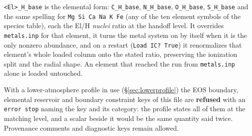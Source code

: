 \documentclass[english,a4paper]{my_memo}
\begin{document}
\texttt{<El>\_H\_base} is the elemental form: \texttt{C\_H\_base},
\texttt{N\_H\_base}, \texttt{O\_H\_base}, \texttt{S\_H\_base} and the same
spelling for \texttt{Mg Si Ca Na K Fe} (any of the ten element symbols of
the species table), each the El/H \emph{nuclei} ratio at the handoff level.
It overrides \texttt{metals.inp} for that element, it turns the metal system on
by itself when it is the only nonzero abundance, and on a restart
(\texttt{Load IC? True}) it renormalizes that element's whole loaded column
onto the stated ratio, preserving the ionization split and the radial shape.
An element that reached the run from \texttt{metals.inp} alone is loaded
untouched.

With a lower-atmosphere profile in use (\S\ref{sec:lowerprofile}) the EOS
boundary, elemental reservoir and boundary constraint keys of this file are
\textbf{refused} with an \texttt{error stop} naming the key and its category:
the profile states all of them at the matching level, and a scalar beside it
would be the same quantity said twice. Provenance comments and diagnostic keys
remain allowed.
\end{document}
